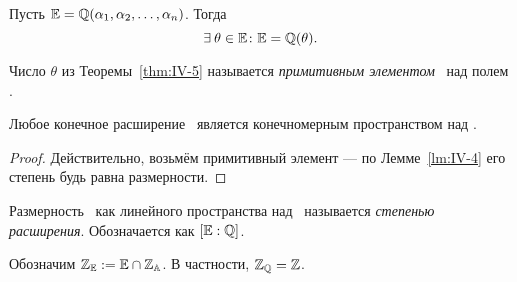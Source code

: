 \begin{ntheorem}
\label{thm:IV-5}
    Пусть $\mathbb{E} = \mathbb{Q}(\alpha_1, \alpha_2, \dots, \alpha_n)$. Тогда
    \[
        \exists \theta \in \EE\colon \EE = \QQ(\theta).
    \]
\end{ntheorem}

\begin{ndefinition}
\label{def:IV_primitive-element}
    Число $\theta$ из Теоремы~\ref{thm:IV-5} называется \emph{примитивным элементом} \EE~над полем \QQ.
\end{ndefinition}

\begin{corollary}
    Любое конечное расширение \QQ~является конечномерным пространством над \QQ.
\end{corollary}
\begin{proof}
    Действительно, возьмём примитивный элемент --- по Лемме~\ref{lm:IV-4} его степень будь равна размерности.
\end{proof}

\begin{ndefinition}
\label{def:IV_extension-degree}
    Размерность \EE~как линейного пространства над \QQ~называется \emph{степенью расширения}. Обозначается как $\left[\mathbb{E} : \mathbb{Q}\right]$.
\end{ndefinition}

Обозначим $\mathbb{Z}_{\mathbb{E}} := \mathbb{E} \cap \mathbb{Z}_{\mathbb{A}}$. В частности, $\mathbb{Z}_{\mathbb{Q}} = \mathbb{Z}$.
